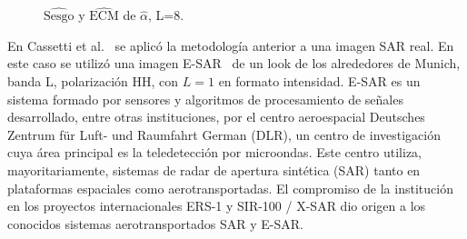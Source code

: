 \begin{figure}[htb]
	\centering
	\caption{\small $\widehat{\text{Sesgo}}$ y $\widehat{\text{ECM}}$ de $\widehat{\alpha}$, L=$8$.}
\end{figure}

En Cassetti et al.~\cite{APSAR2013ParameterEstimationStochasticDistances} se aplicó la metodología anterior a una imagen SAR real. En este caso se utilizó una imagen E-SAR~\cite{Horn1996} de un look de los alrededores de Munich, banda L, polarización HH, con $L=1$ en formato intensidad.
E-SAR es un sistema formado por sensores y algoritmos de procesamiento de señales desarrollado, entre otras instituciones, por el centro aeroespacial Deutsches Zentrum für Luft- und Raumfahrt German (DLR), un centro de investigación cuya área principal es la teledetección por microondas.  Este centro utiliza, mayoritariamente, sistemas de radar de apertura sintética (SAR) tanto en plataformas espaciales como aerotransportadas. El compromiso de la institución en los proyectos internacionales ERS-1 y SIR-100 / X-SAR dio origen a los conocidos sistemas aerotransportados SAR y E-SAR. 

